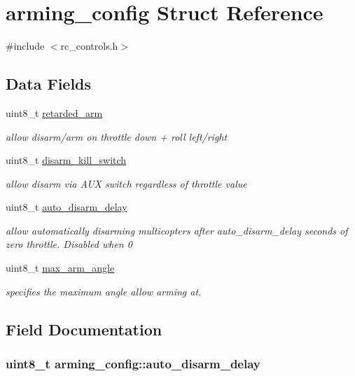 \hypertarget{structarming__config}{\section{arming\+\_\+config Struct Reference}
\label{structarming__config}
}


{\ttfamily \#include $<$rc\+\_\+controls.\+h$>$}

\subsection*{Data Fields}
\begin{DoxyCompactItemize}
\item 
uint8\+\_\+t \hyperlink{structarming__config_a4eaf67fe36c6b358f01805370a9f253f}{retarded\+\_\+arm}
\begin{DoxyCompactList}\small\item\em allow disarm/arm on throttle down + roll left/right \end{DoxyCompactList}\item 
uint8\+\_\+t \hyperlink{structarming__config_acc0f84a6d1171a1a5860cfc94ebdcd1d}{disarm\+\_\+kill\+\_\+switch}
\begin{DoxyCompactList}\small\item\em allow disarm via A\+U\+X switch regardless of throttle value \end{DoxyCompactList}\item 
uint8\+\_\+t \hyperlink{structarming__config_a891638767290d7c4a049958f913bb37d}{auto\+\_\+disarm\+\_\+delay}
\begin{DoxyCompactList}\small\item\em allow automatically disarming multicopters after auto\+\_\+disarm\+\_\+delay seconds of zero throttle. Disabled when 0 \end{DoxyCompactList}\item 
uint8\+\_\+t \hyperlink{structarming__config_a02175f326375063ce0436b7026c24fd1}{max\+\_\+arm\+\_\+angle}
\begin{DoxyCompactList}\small\item\em specifies the maximum angle allow arming at. \end{DoxyCompactList}\end{DoxyCompactItemize}


\subsection{Field Documentation}
\hypertarget{structarming__config_a891638767290d7c4a049958f913bb37d}{
\subsubsection[{auto\+\_\+disarm\+\_\+delay}]{\setlength{\rightskip}{0pt plus 5cm}uint8\+\_\+t arming\+\_\+config\+::auto\+\_\+disarm\+\_\+delay}}\label{structarming__config_a891638767290d7c4a049958f913bb37d}


